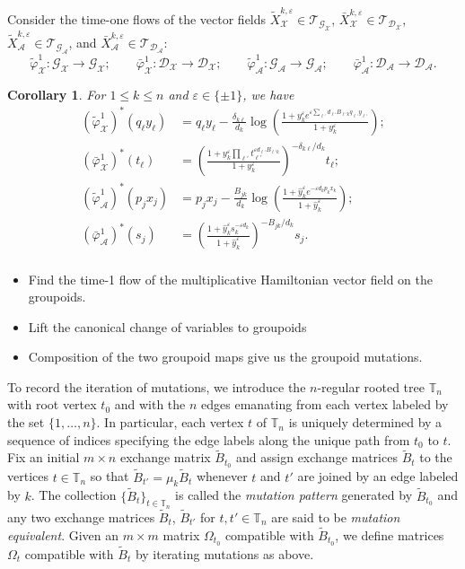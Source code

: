 \documentclass{amsart}
\newtheorem{corollary}[theorem]{Corollary}
\numberwithin{equation}{section}
\newcommand{\cA}{\mathcal{A}}
\newcommand{\cG}{\mathcal{G}}
\newcommand{\cD}{\mathcal{D}}
\newcommand{\cX}{\mathcal{X}}
\newcommand{\cT}{\mathcal{T}}
\newcommand{\TT}{\mathbb{T}}
\begin{document}
Consider the time-one flows of the vector fields $\tilde X_\cX^{k,\varepsilon}\in\cT_{\cG_\cX}$, $\bar X_\cX^{k,\varepsilon}\in\cT_{\cD_\cX}$, $\tilde X_\cA^{k,\varepsilon}\in\cT_{\cG_\cA}$, and $\bar X_\cA^{k,\varepsilon}\in\cT_{\cD_\cA}$:
\[
  \tilde\varphi_\cX^1:\cG_\cX\to\cG_\cX;\qquad
  \bar\varphi_\cX^1:\cD_\cX\to\cD_\cX;\qquad
  \tilde\varphi_\cA^1:\cG_\cA\to\cG_\cA;\qquad
  \bar\varphi_\cA^1:\cD_\cA\to\cD_\cA.
\]
\begin{corollary}
  For $1\le k\le n$ and $\varepsilon\in\{\pm1\}$, we have
  \begin{align*}
    (\tilde\varphi_\cX^1)^*(q_\ell y_\ell)&=q_\ell y_\ell-\frac{\delta_{k\ell}}{d_k}\log\left(\frac{1+y_k^\varepsilon e^{\varepsilon\sum_{\ell'} d_{\ell'} B_{\ell' k}q_{\ell'} y_{\ell'}}}{1+y_k^\varepsilon}\right);\\
    (\bar\varphi_\cX^1)^*(t_\ell)&=\left(\frac{1+y_k^\varepsilon \prod_{\ell'}t_{\ell'}^{\varepsilon d_{\ell'} B_{\ell' k}}}{1+y_k^\varepsilon}\right)^{-\delta_{k\ell}/d_k}t_\ell;\\
    (\tilde\varphi_\cA^1)^*(p_jx_j)&=p_jx_j-\frac{B_{jk}}{d_k}\log\left(\frac{1+\hat y_k^\varepsilon e^{-\varepsilon d_kp_kx_k}}{1+\hat y_k^\varepsilon}\right);\\
    (\bar\varphi_\cA^1)^*(s_j)&=\left(\frac{1+\hat y_k^\varepsilon s_k^{-\varepsilon d_k}}{1+\hat y_k^\varepsilon}\right)^{-B_{jk}/d_k}s_j.\\
  \end{align*}
\end{corollary}

\newpage

\begin{itemize}
\item Find the time-1 flow of the multiplicative Hamiltonian vector field on the groupoids.
\item Lift the canonical change of variables to groupoids
\item Composition of the two groupoid maps give us the groupoid mutations.
\end{itemize}

\newpage 

To record the iteration of mutations, we introduce the $n$-regular rooted tree $\TT_n$ with root vertex $t_0$ and with the $n$ edges emanating from each vertex labeled by the set $\{1,\ldots,n\}$.
In particular, each vertex $t$ of $\TT_n$ is uniquely determined by a sequence of indices specifying the edge labels along the unique path from $t_0$ to $t$.
Fix an initial $m\times n$ exchange matrix $\tilde B_{t_0}$ and assign exchange matrices $\tilde B_t$ to the vertices $t\in\TT_n$ so that $\tilde B_{t'}=\mu_k\tilde B_t$ whenever $t$ and $t'$ are joined by an edge labeled by $k$.
The collection $\{\tilde B_t\}_{t\in\TT_n}$ is called the \emph{mutation pattern} generated by $\tilde B_{t_0}$ and any two exchange matrices $\tilde B_t$, $\tilde B_{t'}$ for $t,t'\in\TT_n$ are said to be \emph{mutation equivalent}.
Given an $m\times m$ matrix $\Omega_{t_0}$ compatible with $\tilde B_{t_0}$, we define matrices $\Omega_t$ compatible with $\tilde B_t$ by iterating mutations as above.
\end{document}
